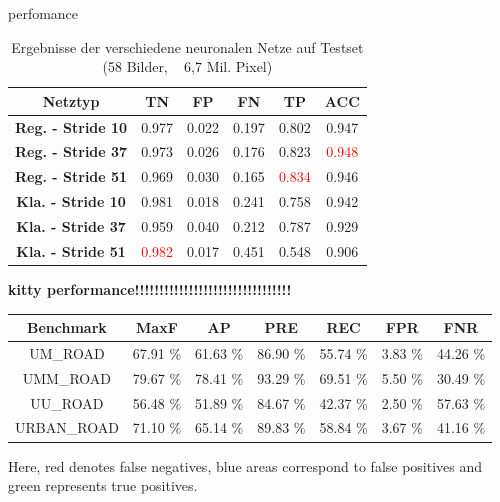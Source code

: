 perfomance
      \begin{table}[h!]
  \begin{center}
    \label{tab:table1}
    \begin{tabular}{c|ccccc}
    \toprule
      \textbf{Netztyp} & \textbf{TN} & \textbf{FP} & \textbf{FN} & \textbf{TP} & \textbf{ACC} \\
       \midrule
      \textbf{Reg. - Stride 10} & 0.977 & 0.022 & 0.197 & 0.802 & 0.947\\
      \textbf{Reg. - Stride 37} & 0.973 & 0.026 & 0.176 & 0.823 &  \textcolor{red}{0.948}\\ 
      \textbf{Reg. - Stride 51} & 0.969 & 0.030 & 0.165 & \textcolor{red}{0.834} & 0.946\\
      \midrule
      \textbf{Kla. - Stride 10} & 0.981 & 0.018 & 0.241 & 0.758 & 0.942\\
      \textbf{Kla. - Stride 37} & 0.959 & 0.040 & 0.212 & 0.787 & 0.929\\
      \textbf{Kla. - Stride 51} & \textcolor{red}{0.982} & 0.017 & 0.451 & 0.548 & 0.906\\
      \bottomrule
    \end{tabular}
    \caption{Ergebnisse der verschiedene neuronalen Netze auf Testset (58 Bilder, ~ 6,7 Mil. Pixel)}
  \end{center}
\end{table}

\textbf{kitty performance!!!!!!!!!!!!!!!!!!!!!!!!!!!!!!!!}
      \begin{table}[h!]
  \begin{center}
\begin{tabular}{c | c | c | c | c | c | c}
 {\bf Benchmark} & {\bf MaxF} & {\bf AP} & {\bf PRE} & {\bf REC} & {\bf FPR} & {\bf FNR}\\ \hline
UM\_ROAD & 67.91 \% & 61.63 \% & 86.90 \% & 55.74 \% & 3.83 \% & 44.26 \%\\
UMM\_ROAD & 79.67 \% & 78.41 \% & 93.29 \% & 69.51 \% & 5.50 \% & 30.49 \%\\
UU\_ROAD & 56.48 \% & 51.89 \% & 84.67 \% & 42.37 \% & 2.50 \% & 57.63 \%\\
URBAN\_ROAD & 71.10 \% & 65.14 \% & 89.83 \% & 58.84 \% & 3.67 \% & 41.16 \%\\
\end{tabular}
  \end{center}
\end{table}

Here, red denotes false negatives, blue areas correspond to false positives and green represents true positives. 

